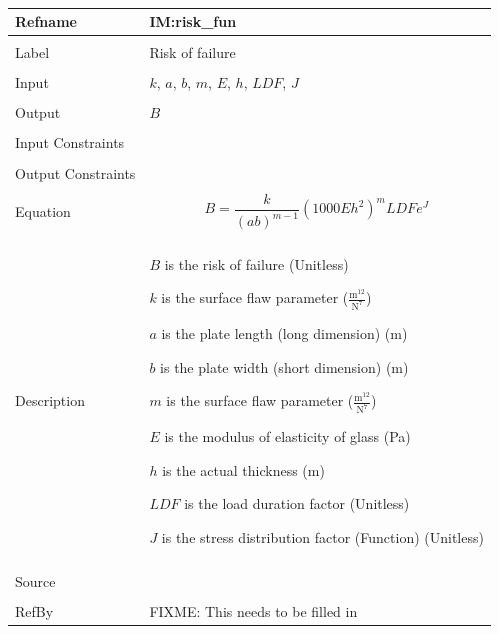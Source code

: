 \documentclass[12pt]{article}
\begin{document}
~\newline
\noindent \begin{minipage}{\textwidth}
\begin{tabular}{p{} p{}}
\toprule \textbf{Refname} & \textbf{IM:risk\_fun}
\label{IM:risk\_fun}
\\ \midrule \\
Label & Risk of failure
\\ \midrule \\
Input & $k$, $a$, $b$, $m$, $E$, $h$, $LDF$, $J$
\\ \midrule \\
Output & $B$
\\ \midrule \\
Input Constraints & 
\\ \midrule \\
Output Constraints & 
\\ \midrule \\
Equation & \begin{dmath}
           B=\frac{k}{\left(a b\right)^{m-1}} \left(1000 E h^{2}\right)^{m} LDF e^{J}
           \end{dmath}
\\ \midrule \\
Description & \begin{description}
              \item{$B$ is the risk of failure (Unitless)}
              \item{$k$ is the surface flaw parameter ($\frac{\text{m}^{12}}{\text{N}^{7}}$)}
              \item{$a$ is the plate length (long dimension) (m)}
              \item{$b$ is the plate width (short dimension) (m)}
              \item{$m$ is the surface flaw parameter ($\frac{\text{m}^{12}}{\text{N}^{7}}$)}
              \item{$E$ is the modulus of elasticity of glass (Pa)}
              \item{$h$ is the actual thickness (m)}
              \item{$LDF$ is the load duration factor (Unitless)}
              \item{$J$ is the stress distribution factor (Function) (Unitless)}
              \end{description}
\\ \midrule \\
Source & 
\\ \midrule \\
RefBy & FIXME: This needs to be filled in
\\ \bottomrule \end{tabular}
\end{minipage}\\
\end{document}

